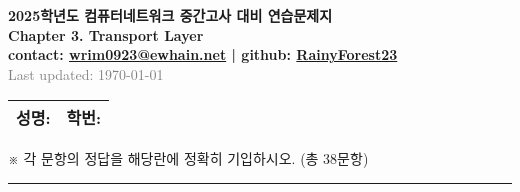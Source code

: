\documentclass[a4paper, 10pt]{article}
\begin{document}
\begin{center}
  \Large\textbf{2025학년도 컴퓨터네트워크 중간고사 대비 연습문제지}\\[8pt]
  \large\textbf{Chapter 3. Transport Layer}\\[5pt]
  \small\textbf{contact: \href{mailto:wrim0923@ewhain.net}{wrim0923@ewhain.net} | github: \href{https://github.com/RainyForest23}{RainyForest23}}\\[5pt]
  \small\textcolor{gray}{Last updated: \today}
\end{center}

\vspace{0.5cm}

\begin{tabular}{|m{}|m{}|}
\hline
\textbf{성명:} \hfill & \textbf{학번:} \hfill \\[0.8em]
\hline
\end{tabular}
\vspace{1em}

\noindent
{\small ※ 각 문항의 정답을 해당란에 정확히 기입하시오. (총 38문항)}

\vspace{0.5em}
\noindent\rule{\textwidth}{0.8pt}
\vspace{0.5em}
\end{document}
